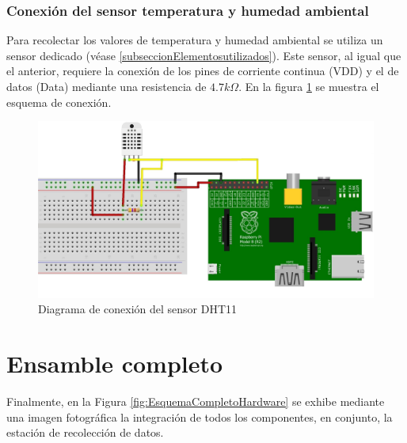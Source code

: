     \subsubsection{Conexión del sensor temperatura y humedad ambiental}
        \par Para recolectar los valores de temperatura y humedad ambiental se utiliza un sensor dedicado (véase \ref{subseccionElementosutilizados}). Este sensor, al igual que el anterior, requiere la conexión de los pines de corriente continua (VDD) y el de datos (Data) mediante una resistencia de $4.7k\Omega$. En la figura \ref{fig:EsquemaDHT11} se muestra el esquema de conexión.
        \begin{figure}[h]
            \centering
            \includegraphics[scale = 0.8]{DiagramaSensorDHT11_bb.jpg}
            \caption{Diagrama de conexión del sensor DHT11}
            \label{fig:EsquemaDHT11}
        \end{figure}

\section{Ensamble completo}

    \par Finalmente, en la Figura \ref{fig:EsquemaCompletoHardware} se exhibe mediante una imagen fotográfica la integración de todos los componentes, en conjunto, la estación de recolección de datos.\\


